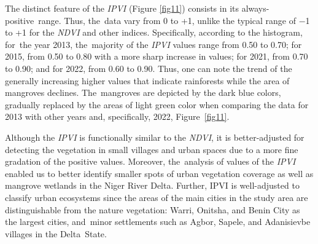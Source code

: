 \documentclass[jmse,article,accept,pdftex,moreauthors]{Definitions/mdpi}
\begin{document}
The distinct feature of the \emph{IPVI} (Figure \ref{fig11}) consists in its always-positive~range. Thus, the~data vary from 0 to +1, unlike the typical range of $-$1 to +1 for the \emph{NDVI} and other indices. Specifically, according to the histogram, for~the year 2013, the~majority of the \emph{IPVI} values range from 0.50 to 0.70; for 2015, from 0.50 to 0.80 with a more sharp increase in values; for 2021, from 0.70 to 0.90; and for 2022, from 0.60 to 0.90. Thus, one can note the trend of the generally increasing higher values that indicate rainforests while the area of mangroves declines. The~mangroves are depicted by the dark blue colors, gradually replaced by the areas of light green color when comparing the data for 2013 with other years and, specifically, 2022, Figure~\ref{fig11}.%

Although the \emph{IPVI} is functionally similar to the \emph{NDVI}, it is better-adjusted for detecting the vegetation in small villages and urban spaces due to a more fine gradation of the positive values. Moreover, the~analysis of values of the \emph{IPVI} enabled us to better identify smaller spots of urban vegetation coverage as well as mangrove wetlands in the Niger River Delta. Further, IPVI is well-adjusted to classify urban ecosystems since the areas of the main cities in the study area are distinguishable from the nature vegetation: Warri, Onitsha, and Benin City as the largest cities, and~minor settlements such as Agbor, Sapele, and Adanisievbe villages in the Delta~State.
\end{document}
